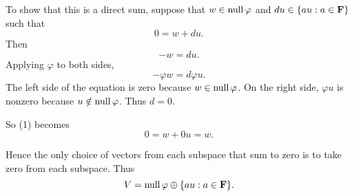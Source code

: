 \documentclass[a5paper]{article}
\begin{document}
    To show that this is a direct sum, suppose that $w \in \operatorname{null}\varphi$ and $du \in \{au : a \in \mathbf{F}\}$ such that
\begin{equation}
        0 = w + du .
\end{equation}
    Then
\begin{equation*}
        -w = du .
\end{equation*}
    Applying $\varphi$ to both sides,
\begin{equation*}
         -\varphi w = d \varphi u .
\end{equation*}
    The left side of the equation is zero because $w \in \operatorname{null}\varphi$.
    On the right side, $\varphi u$ is nonzero because $u \notin \operatorname{null}\varphi$.
    Thus $d = 0$.

    So (1) becomes
\begin{equation*}
        0 = w + 0u = w.
\end{equation*}

    Hence the only choice of vectors from each subspace that sum to zero is to take zero from each subspace.
    Thus
\begin{equation*}
        V = \operatorname{null}\varphi \oplus \{au : a \in \mathbf{F}\} .
\end{equation*}
\end{document}
